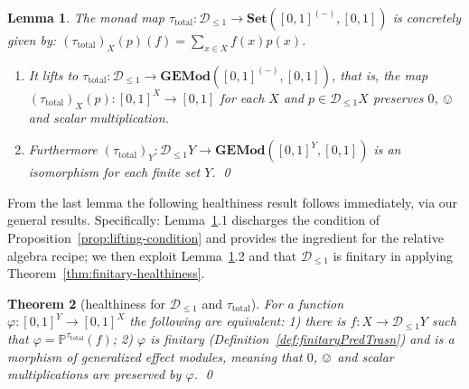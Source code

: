 \documentclass[9pt, preprint]{sigplanconf}
\theoremstyle{theorem}
\newtheorem{theorem}{Theorem}[section]
\newtheorem{lemma}[theorem]{Lemma}
\theoremstyle{definition}
\renewcommand{\phi}{\varphi}
\newcommand{\sdist}{\mathcal{D}_{\le 1}}
\newcommand{\place}{{-}}
\newcommand{\uintv}{[0, 1]}
\newcommand{\Set}{\mathbf{Set}}
\newcommand{\Sets}{\Set}
\newcommand{\GEMod}{\mathbf{GEMod}}
\DeclarePairedDelimiter\ket{\lvert}{\rangle}
\DeclarePairedDelimiter\p{(}{)}
\newif\ifignore \ignorefalse
\newcommand{\auxproof}[1]{
\ifignore\mbox{}\newline
\textbf{BEGIN: AUX-PROOF} \dotfill\newline
{#1}\mbox{}\newline
\textbf{END: AUX-PROOF}\dotfill\newline
\fi}
\def\myqed{\qed}
\newcommand{\bbP}{\mathbb{P}}
\newcommand{\tauTotal}{\tau_{\mathrm{total}}}
\begin{document}
\begin{lemma}\label{lem:monadMapFromTauTotal}
The monad map $\tauTotal\colon \sdist\to \Sets(\uintv^{(\place)},
 \uintv)$  is concretely given by:
  $(\tauTotal)_X(p)(f)
  = \sum_{x \in X} f(x) p(x)$.
\begin{enumerate}
 \item
 It lifts to
 $\tauTotal\colon \sdist\to \GEMod(\uintv^{(\place)},
 \uintv)$, that is, the map $(\tauTotal)_X(p)\colon [0,1]^{X}\to [0,1] $ for each $X$ and $p\in
 \sdist X$ preserves $0$, $\ovee$ and scalar multiplication.
 \item Furthermore
$(\tauTotal)_{Y}\colon \sdist Y\to \GEMod(\uintv^{Y},
 \uintv)$ is an isomorphism for each \emph{finite} set $Y$.
  \myqed
\end{enumerate}
\end{lemma}









\auxproof{
\begin{proof}
  Let us construct the inverse
  $\mu_X \colon \GEMod(\uintv^X, \uintv) \to \sdist X$.
  Given $\phi \colon \uintv^X \to \uintv$ in $\GEMod$,
  construct a subdistribution $\mu_X(\phi)$ on $X$ by
  $\mu_X(\phi) = \sum_{x \in X} \phi(\delta_x) \ket{x}$ where
  $\delta_x(x) = 1$ and $\delta_x(y) = 1$ for $y \neq x$.
  The sum is well-defined by the finiteness of $X$.
  We also have $\sum_{x \in X} \phi(\delta_x) \leq 1$ since
  $\sum_{x \in X} \delta_x \le 1$ and
  $\sum_{x \in X} \phi(\delta_x) = \phi \p*{\sum_{x \in X} \delta_x} \le 1$.
  It is easy to check $\sigma_X$ and $\mu_X$ are mutually inverse.
\end{proof}
}

From the last lemma the following healthiness result follows
immediately, via our general results. Specifically:
Lemma~\ref{lem:monadMapFromTauTotal}.1 discharges the condition of
Proposition~\ref{prop:lifting-condition} and provides the ingredient for
the relative algebra recipe; we then exploit
Lemma~\ref{lem:monadMapFromTauTotal}.2 and that $\sdist$ is finitary
in applying Theorem~\ref{thm:finitary-healthiness}.
\begin{theorem}[healthiness for $\sdist$ and $\tauTotal$]
 For a function $\varphi \colon \uintv^Y \to \uintv^X$ the following
 are equivalent: 1) there is $f\colon X\to \sdist Y$ such that
 $\varphi=\bbP^{\tauTotal}(f)$; 2) $\phi$ is finitary
 (Definition~\ref{def:finitaryPredTrasn}) and is a morphism of
 generalized effect modules, meaning that $0$, $\ovee$ and scalar
 multiplications are preserved by $\varphi$. \qed
\end{theorem}
\end{document}
